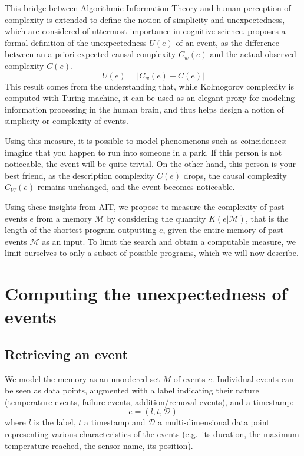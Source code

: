 \documentclass[conference]{IEEEtran}
\begin{document}
This bridge between Algorithmic Information Theory and human perception of
complexity is extended to define the notion of simplicity and unexpectedness,
which are considered of uttermost importance in cognitive science\cite{chater_simplicity_2003}.
\cite{dessalles2011coincidences} proposes a formal definition of the unexpectedness $U(e)$
of an event, as the difference between an a-priori expected causal
complexity $C_{w}(e)$ and the actual observed complexity $C(e)$.
\begin{equation}
  \label{eq:unexpected}
  U(e) = |C_{w}(e) - C(e)|
\end{equation}
This result comes from the understanding that, while Kolmogorov complexity is
computed with Turing machine, it can be used as an elegant proxy for modeling
information processing in the human brain, and thus helps design a notion of
simplicity or complexity of events.

Using this measure, it is possible to model phenomenons such as coincidences:
imagine that you happen to run into someone in a park. If this person is not
noticeable, the event will be quite trivial. On the other hand, this person is
your best friend, as the description complexity $C(e)$ drops, the causal
complexity $C_{W}(e)$ remains unchanged, and the event becomes noticeable.

Using these insights from AIT, we propose to measure the complexity of past
events $e$ from a memory $\mathcal{M}$ by considering the quantity
$K(e|\mathcal{M})$, that is the length of the shortest program outputting $e$,
given the entire memory of past events $\mathcal{M}$ as an input. To limit the
search and obtain a computable measure, we limit ourselves to only a subset of
possible programs, which we will now describe.

\section{Computing the unexpectedness of events}
\label{sec:computing}
\subsection{Retrieving an event}
We model the memory as an unordered set $M$ of events $e$. Individual events can
be seen as data points, augmented with a label indicating their nature
(temperature events, failure events, addition/removal events), and a timestamp:
\begin{equation}
  \label{eq:event}
  e = (l, t,\mathcal{D})
\end{equation}
where $l$ is the label, $t$ a timestamp and $\mathcal{D}$ a multi-dimensional
data point representing various characteristics of the events (e.g.~its duration,
the maximum temperature reached, the sensor name, its position).
\end{document}

